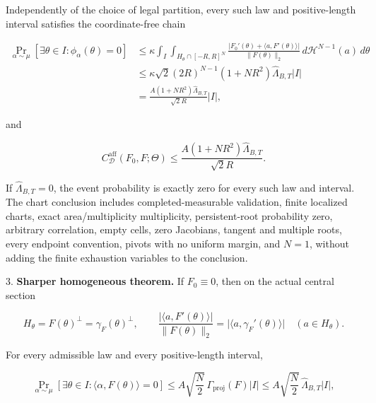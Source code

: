 \begin{proposition}
   Independently of the choice of legal partition, every such law and positive-length interval satisfies the
   coordinate-free chain
   
\begin{equation}
\label{eq:appendix-indented-039}
   \begin{aligned}
   \Pr_{\alpha\sim\mu}[\exists\theta\in I:\phi_\alpha(\theta)=0]
   &\leq
   \kappa\int_I\int_{H_\theta\cap[-R,R]^N}
   \frac{\lvert F_0'(\theta)+\langle a,F'(\theta)\rangle\rvert}
   {\lVert F(\theta)\rVert_2}
   \,d\mathcal H^{N-1}(a)\,d\theta\\
   &\leq
   \kappa\sqrt2(2R)^{N-1}(1+NR^2)\widehat\Lambda_{B,T}\lvert I\rvert\\
   &=\frac{A(1+NR^2)\widehat\Lambda_{B,T}}{\sqrt2R}\lvert I\rvert,
   \end{aligned}
\end{equation}
   
   and
   
\begin{equation}
\label{eq:appendix-indented-040}
   C^{\mathrm{aff}}_{\mathcal D}(F_0,F;\Theta)
   \leq\frac{A(1+NR^2)\widehat\Lambda_{B,T}}{\sqrt2R}.
\end{equation}
   
   If \(\widehat\Lambda_{B,T}=0\), the event probability is exactly zero for every such law and interval.
   The chart conclusion includes completed-measurable validation, finite localized charts, exact area/multiplicity
   multiplicity, persistent-root probability zero, arbitrary correlation, empty cells, zero Jacobians,
   tangent and multiple roots, every endpoint convention, pivots with no uniform margin, and \(N=1\), without
   adding the finite exhaustion variables to the conclusion.

3. \textbf{Sharper homogeneous theorem.} If \(F_0\equiv0\), then on the actual central section
   
\begin{equation}
\label{eq:appendix-indented-041}
   H_\theta=F(\theta)^\perp=\gamma_F(\theta)^\perp,
   \qquad
   \frac{\lvert\langle a,F'(\theta)\rangle\rvert}{\lVert F(\theta)\rVert_2}
   =\lvert\langle a,\gamma_F'(\theta)\rangle\rvert
   \quad(a\in H_\theta).
\end{equation}
   
   For every admissible law and every positive-length interval,
   
\begin{equation}
\label{eq:appendix-indented-042}
   \Pr_{\alpha\sim\mu}[\exists\theta\in I:\langle\alpha,F(\theta)\rangle=0]
   \leq A\sqrt{\frac N2}\,\Gamma_{\mathrm{proj}}(F)\lvert I\rvert
   \leq A\sqrt{\frac N2}\,\widehat\Lambda_{B,T}\lvert I\rvert,
\end{equation}
   

\end{proposition}
